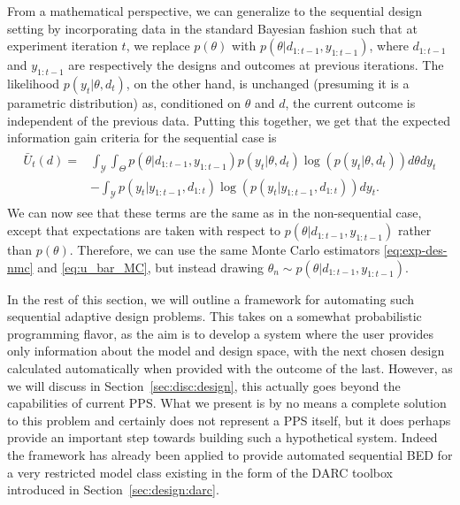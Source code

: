 From a mathematical perspective, we can generalize to the sequential design setting by 
incorporating data in the standard Bayesian fashion such that
at experiment iteration $t$, we replace $p\left(\theta\right)$ with 
$p\left(\theta | d_{1:t-1}, y_{1:t-1}\right)$, where $d_{1:t-1}$ and  $y_{1:t-1}$ are 
respectively the designs and outcomes at previous iterations.
The likelihood $p\left(y_t | \theta, d_t\right)$, on the other hand, is unchanged (presuming it 
is a parametric distribution) as, conditioned on 
$\theta$ and $d$, the current outcome is independent of the previous data.
Putting this together, we get that the expected information gain criteria for the
sequential case is
\begin{align}
\label{eq:u_bar_seq}
\begin{split}
\bar{U}_t(d)
=&\int_{\mathcal{Y}}\int_{\Theta} p\left(\theta | d_{1:t-1}, y_{1:t-1}\right)
p(y_t | \theta, d_t) \log(p(y_t | \theta, d_t)) d\theta dy_t \\
&- \int_{\mathcal{Y}} p(y_t | y_{1:t-1}, d_{1:t}) \log(p(y_t | y_{1:t-1}, d_{1:t}))dy_t.
\end{split}
\end{align}
We can now see that these terms are the same as in the non-sequential case,
except that expectations are taken with respect to $p\left(\theta | d_{1:t-1}, y_{1:t-1}\right)$
rather than $p(\theta)$.  Therefore, we can use the same Monte Carlo estimators
\eqref{eq:exp-des-nmc} and \eqref{eq:u_bar_MC}, but instead drawing $\theta_n\sim p\left(\theta | d_{1:t-1}, y_{1:t-1}\right)$.

In the rest of this section, we will outline a framework for automating such sequential
adaptive design problems.  This takes on a somewhat probabilistic programming flavor, as
the aim is to develop a system where the user provides only information about the model and
design space, with the next chosen design calculated automatically when provided with
the outcome of the last.  However, as we will discuss in Section~\ref{sec:disc:design}, this actually goes
beyond the capabilities of current PPS.  What we present is by no means a complete solution to
this problem and certainly does not represent a PPS itself, but it does perhaps provide an important
step towards building such a hypothetical system.   Indeed the framework has already been
applied to provide automated sequential BED for a very restricted model class existing in the form of
the DARC toolbox~\citep{vincent2017darc} introduced in Section~\ref{sec:design:darc}.

